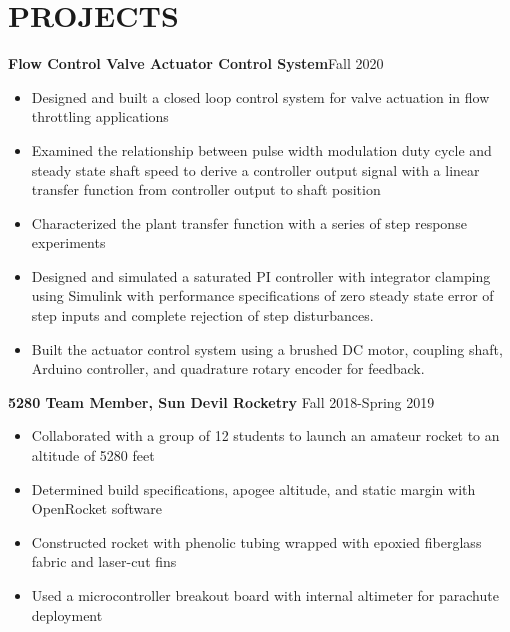 \documentclass{article}
\begin{document}
\section{PROJECTS}
\textbf{Flow Control Valve Actuator Control System}\hfill Fall 2020
\vspace{0.5em}
\begin{itemize}
	\item Designed and built a closed loop control system for valve actuation in flow throttling applications
	\item Examined the relationship between pulse width modulation duty cycle and steady state shaft speed to derive a controller output signal with a linear transfer function from controller output to shaft position  
	\item Characterized the plant transfer function with a series of step response experiments
	\item  Designed and simulated a saturated PI controller with integrator clamping using Simulink with performance specifications of zero steady state error of step inputs and complete rejection of step disturbances.
	\item  Built the actuator control system using a brushed DC motor, coupling shaft, Arduino controller, and quadrature rotary encoder for feedback.
\end{itemize}
\vspace{0.5em}
\textbf{5280 Team Member, Sun Devil Rocketry}
\hfill Fall 2018-Spring 2019
\vspace{0.5em}
\begin{itemize}
	\item Collaborated with a group of 12 students to launch an amateur rocket to an altitude of 5280 feet
	\item Determined build specifications, apogee altitude, and static margin with OpenRocket software
	\item Constructed rocket with phenolic tubing wrapped with epoxied fiberglass fabric and laser-cut fins 
	\item Used a microcontroller breakout board with internal altimeter for parachute deployment
\end{itemize}

\thispagestyle{empty}
\end{document}
